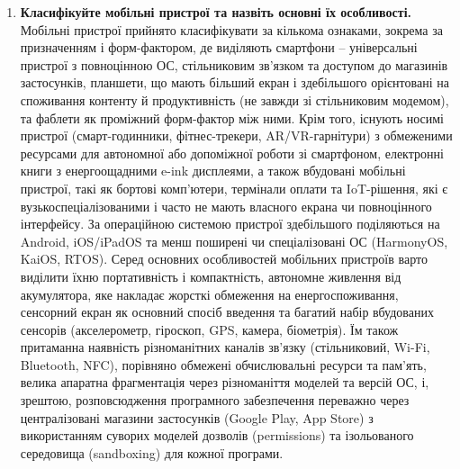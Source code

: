 \documentclass[14pt, a4paper]{extreport}
\begin{document}
	\begin{enumerate}
		\item \textbf{Класифікуйте мобільні пристрої та назвіть основні їх особливості.} Мобільні пристрої прийнято класифікувати за кількома ознаками, зокрема за призначенням і форм-фактором, де виділяють смартфони -- універсальні пристрої з повноцінною ОС, стільниковим зв'язком та доступом до магазинів застосунків, планшети, що мають більший екран і здебільшого орієнтовані на споживання контенту й продуктивність (не завжди зі стільниковим модемом), та фаблети як проміжний форм-фактор між ними. Крім того, існують носимі пристрої (смарт-годинники, фітнес-трекери, AR/VR-гарнітури) з обмеженими ресурсами для автономної або допоміжної роботи зі смартфоном, електронні книги з енергоощадними e-ink дисплеями, а також вбудовані мобільні пристрої, такі як бортові комп'ютери, термінали оплати та IoT-рішення, які є вузькоспеціалізованими і часто не мають власного екрана чи повноцінного інтерфейсу. За операційною системою пристрої здебільшого поділяються на Android, iOS/iPadOS та менш поширені чи спеціалізовані ОС (HarmonyOS, KaiOS, RTOS). Серед основних особливостей мобільних пристроїв варто виділити їхню портативність і компактність, автономне живлення від акумулятора, яке накладає жорсткі обмеження на енергоспоживання, сенсорний екран як основний спосіб введення та багатий набір вбудованих сенсорів (акселерометр, гіроскоп, GPS, камера, біометрія). Їм також притаманна наявність різноманітних каналів зв'язку (стільниковий, Wi-Fi, Bluetooth, NFC), порівняно обмежені обчислювальні ресурси та пам'ять, велика апаратна фрагментація через різноманіття моделей та версій ОС, і, зрештою, розповсюдження програмного забезпечення переважно через централізовані магазини застосунків (Google Play, App Store) з використанням суворих моделей дозволів (permissions) та ізольованого середовища (sandboxing) для кожної програми.


\end{enumerate}
\end{document}

